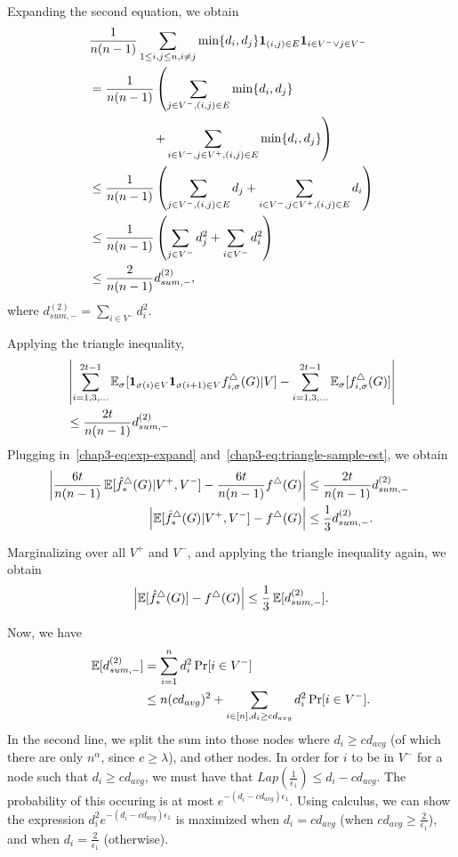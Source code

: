 Expanding the second equation, we obtain
\begin{align*}
  &\frac{1}{n(n-1)} \sum_{1\leq i,j \leq n, i \neq j}
  \min\{d_i, d_j\}\textbf{1}_{(i,j) \in E}\textbf{1}_{i \in V^-
  \vee j \in V^-} \\
  &= \frac{1}{n(n-1)}\left( \sum_{j \in V^-, (i,j) \in E} \min\{d_i, d_j\} \right. \\
  &\hspace{18mm} \left. +
  \sum_{i \in V^-, j \in V^+, (i,j) \in E} \min\{d_i, d_j\}\right) \\
  &\leq \frac{1}{n(n-1)}\left( \sum_{j \in V^-, (i,j) \in E} d_j +
  \sum_{i \in V^-, j \in V^+, (i,j) \in E} d_i\right) \\
  &\leq \frac{1}{n(n-1)}\left( \sum_{j \in V^-} d_j^2 +
  \sum_{i \in V^-} d_i^2 \right) \\
  &\leq \frac{2}{n(n-1)}d_{sum,-}^{(2)},
\end{align*}
where $d_{sum,-}^{(2)} = \sum_{i \in V^-} d_i^2$.

Applying the triangle inequality,
\begin{align*}
  &\left|\sum_{i=1,3,\ldots}^{2t-1}\operatorname{\mathbb{E}}_\sigma [\textbf{1}_{\sigma(i)\in V}\textbf{1}_{\sigma(i+1) \in V}
  f_{i,\sigma}^\triangle(G) | V] -
  \sum_{i=1,3,\ldots}^{2t-1}\operatorname{\mathbb{E}}_\sigma[f_{i,\sigma}^\triangle(G) ]\right| \\
  &\leq
  \frac{2t}{n(n-1)} d_{sum,-}^{(2)}
\end{align*}
Plugging in~\eqref{chap3-eq:exp-expand} and~\eqref{chap3-eq:triangle-sample-est}, we obtain
\begin{align}
  \hspace{-1mm}\left|\frac{6t}{n(n-1)}\operatorname{\mathbb{E}}[\hat{f}^\triangle_*(G)|V^+,V^-] -
  \frac{6t}{n(n-1)}f^\triangle(G)\right| &\leq
  \frac{2t}{n(n-1)} d_{sum,-}^{(2)} \nonumber \\
  \hspace{-1mm}\left|\operatorname{\mathbb{E}}[\hat{f}^\triangle_*(G)|V^+,V^-] -
  f^\triangle(G)\right| &\leq \frac{1}{3} d_{sum,-}^{(2)}.\label{chap3-eq:bias-vv}
\end{align}

Marginalizing over all $V^+$ and $V^-$, and applying the triangle inequality again, we obtain
\[
  \left|\operatorname{\mathbb{E}}[\hat{f}^\triangle_*(G)] -
  f^\triangle(G)\right| \leq
  \frac{1}{3} \operatorname{\mathbb{E}}[d_{sum,-}^{(2)}].
\]

Now, we have
\begin{align*}
  \operatorname{\mathbb{E}}[d_{sum,-}^{(2)}] &= \sum_{i = 1}^n d_i^2 \Pr[i \in V^-] \\
  &\leq n(c d_{avg})^2 + \sum_{i \in [n], d_i \geq c d_{avg}} d_i^2 \Pr[i \in
  V^-].
\end{align*}
In the second line, we split the sum into those nodes where $d_i \geq c d_{avg}$
(of which there are only $n^\alpha$, since $c \geq \lambda$), and other nodes.
In order for $i$ to be in $V^-$ for a node such that $d_i \geq c d_{avg}$, we
must have that $Lap(\frac{1}{\epsilon_1}) \leq d_i - c d_{avg}$. The probability
of this occuring is at most $e^{-(d_i - c d_{avg})\epsilon_1}$. Using calculus, we
can show the expression $d_i^2 e^{-(d_i - c d_{avg})\epsilon_1}$ is maximized when 
$d_i = c d_{avg}$ (when 
$c d_{avg} \geq \frac{2}{\epsilon_1}$), and when $d_i = \frac{2}{\epsilon_1}$
(otherwise).

